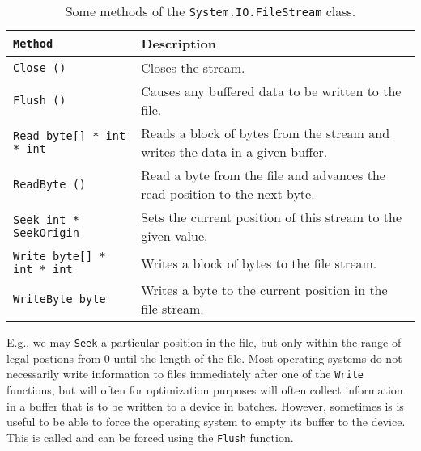 \begin{table}
  \centering
  \begin{tabularx}{\linewidth}{|l|X|}
    \hline
    \rowcolor{headerRowColor}\lstinline{Method} & Description\\
    \hline
    \lstinline{Close ()} & Closes the stream.\\
    \hline
    \lstinline{Flush ()} & Causes any buffered data to be written to the file.\\
    \hline
    \lstinline{Read byte[] * int * int} & Reads a block of bytes from the stream and writes the data in a given buffer.\\
    \hline
    \lstinline{ReadByte ()} & Read a byte from the file and advances the read position to the next byte.\\
    \hline
    \lstinline{Seek int * SeekOrigin} & Sets the current position of this stream to the given value.\\
    \hline
    \lstinline{Write byte[] * int * int} & Writes a block of bytes to the file stream.\\
    \hline
    \lstinline{WriteByte byte} & Writes a byte to the current position in the file stream.\\
    \hline
  \end{tabularx}
  \caption{Some methods of the \lstinline!System.IO.FileStream! class.}
  \label{tab:fileStreamMethods}
\end{table}
E.g., we may \lstinline!Seek! a particular position in the file, but only within the range of legal postions from 0 until the length of the file. Most operating systems do not necessarily write information to files immediately after one of the \lstinline!Write! functions, but will often for optimization purposes will often collect information in a buffer that is to be written to a device in batches. However, sometimes is is useful to be able to force the operating system to empty its buffer to the device. This is called  and can be forced using the \lstinline!Flush! function.


